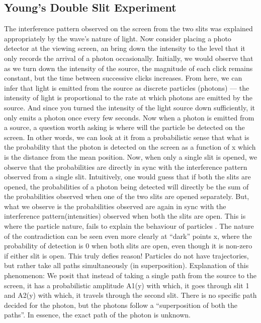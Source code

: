\subsection{Young's Double Slit Experiment}
The interference pattern observed on the screen from the two slits was explained appropriately by the wave’s nature of light.
Now consider placing a photo detector at the viewing screen, an bring down the intensity to the level that it only records the arrival of a photon occasionally. Initially, we would observe  that as we turn down the intensity of the source, the magnitude of each click remains constant, but the time between successive clicks increases. From here, we can infer  that light is emitted from the source as discrete particles (photons) — the intensity of light is proportional to the rate at which photons are emitted by the source. And since you turned the intensity of the light source down sufficiently, it only emits a photon once every few seconds. Now when a photon is emitted from a source, a question worth asking is where will the particle be detected on the screen. In other words, we can look at it from a probabilistic sense that what is the probability that the photon is detected on the screen as a function of x which is the distance from the mean position. Now, when only a single slit is opened, we observe that the probabilities are directly in sync with the interference pattern observed from a single slit. Intuitively, one would guess that if both the slits are opened, the probabilities of a photon being detected will directly be the sum of the probabilities observed when one of the two slits are opened separately. But, what we observe is the probabilities observed are again in sync with the interference pattern(intensities) observed when both the slits are open. This is where the particle nature, fails to explain the behaviour of particles . The nature of the contradiction can be seen even more clearly at “dark” points x, where the probability of detection is 0 when both slits are open, even though it is non-zero if either slit is open. This truly defies reason! Particles do not have trajectories, but rather take all paths simultaneously (in superposition).
Explanation of this phenomenon: We posit that instead of taking a single path from the source to the screen, it has a probabilistic amplitude A1(y) with which, it goes through slit 1 and A2(y) with which, it travels through the second slit. There is no specific path decided for the photon, but the photons follow a “superposition of both the paths”. In essence, the exact path of the photon is unknown.

